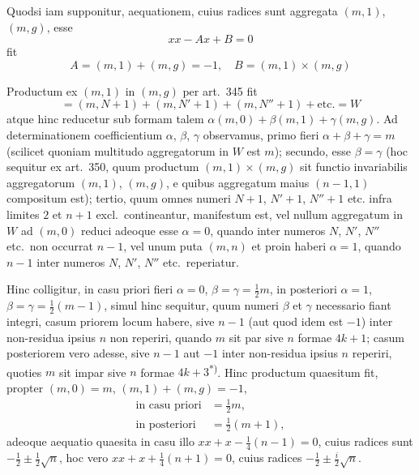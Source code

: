 \documentclass[12pt,a4paper]{article}
\theoremstyle{plain}
\theoremstyle{definition}
\theoremstyle{remark}
\begin{document}
Quodsi iam supponitur, aequationem, cuius radices sunt aggregata $(m,1)$, $(m,g)$, esse
\[xx - Ax + B = 0\]
fit
\[A = (m,1) + (m,g) = -1, \quad B = (m,1) \times (m,g)\]

Productum ex $(m,1)$ in $(m,g)$ per art.\ 345 fit
\[= (m,N+1) + (m,N'+1) + (m,N''+1) + \text{etc.} = W\]
atque hinc reducetur sub formam talem $\alpha(m,0) + \beta(m,1) + \gamma(m,g)$. Ad determinationem coefficientium $\alpha$, $\beta$, $\gamma$ observamus, primo fieri $\alpha + \beta + \gamma = m$ (scilicet quoniam multitudo aggregatorum in $W$ est $m$); secundo, esse $\beta = \gamma$ (hoc sequitur ex art.\ 350, quum productum $(m,1) \times (m,g)$ sit functio invariabilis aggregatorum $(m,1)$, $(m,g)$, e quibus aggregatum maius $(n-1,1)$ compositum est); tertio, quum omnes numeri $N+1$, $N'+1$, $N''+1$ etc. infra limites $2$ et $n+1$ excl.\ contineantur, manifestum est, vel nullum aggregatum in $W$ ad $(m,0)$ reduci adeoque esse $\alpha = 0$, quando inter numeros $N$, $N'$, $N''$ etc.\ non occurrat $n-1$, vel unum puta $(m,n)$ et proin haberi $\alpha = 1$, quando $n-1$ inter numeros $N$, $N'$, $N''$ etc.\ reperiatur.

Hinc colligitur, in casu priori fieri $\alpha = 0$, $\beta = \gamma = \tfrac{1}{2}m$, in posteriori $\alpha = 1$, $\beta = \gamma = \tfrac{1}{2}(m-1)$, simul hinc sequitur, quum numeri $\beta$ et $\gamma$ necessario fiant integri, casum priorem locum habere, sive $n-1$ (aut quod idem est $-1$) inter non-residua ipsius $n$ non reperiri, quando $m$ sit par sive $n$ formae $4k+1$; casum posteriorem vero adesse, sive $n-1$ aut $-1$ inter non-residua ipsius $n$ reperiri, quoties $m$ sit impar sive $n$ formae $4k+3$\textsuperscript{*)}. Hinc productum quaesitum fit, propter $(m,0) = m$, $(m,1) + (m,g) = -1$,
\[
\begin{array}{ll}
\text{in casu priori} & = \tfrac{1}{2}m, \\
\text{in posteriori} & = \tfrac{1}{2}(m+1),
\end{array}
\]
adeoque aequatio quaesita in casu illo $xx + x - \tfrac{1}{4}(n-1) = 0$, cuius radices sunt $-\tfrac{1}{2} \pm \tfrac{1}{2}\sqrt{n}$, hoc vero $xx + x + \tfrac{1}{4}(n+1) = 0$, cuius radices $-\tfrac{1}{2} \pm \tfrac{i}{2}\sqrt{n}$.
\end{document}
